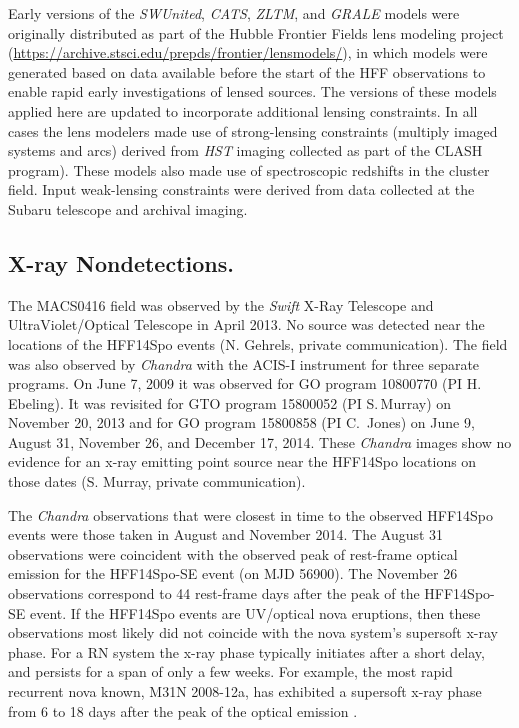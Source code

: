 \documentclass{article}
\providecommand\citep{\cite}
\def\HST{{\it HST}\xspace}
\def\Chandra{{\it Chandra}\xspace}
\def\Swift{{\it Swift}\xspace}
\def\spock{HFF14Spo\xspace}
\def\spocktwo{HFF14Spo-SE\xspace}
\def\MACS0416{MACS0416\xspace}
\begin{document}
Early versions of the {\it SWUnited}, {\it CATS}, {\it ZLTM}, and {\it
  GRALE} models were originally distributed as part of the Hubble
Frontier Fields lens modeling project
(\url{https://archive.stsci.edu/prepds/frontier/lensmodels/}), in
which models were generated based on data available before the start
of the HFF observations to enable rapid early investigations of lensed
sources. The versions of these models applied here are updated to
incorporate additional lensing constraints.  In all cases the lens
modelers made use of strong-lensing constraints (multiply imaged
systems and arcs) derived from \HST imaging collected as part of the
CLASH program\cite{Postman:2012}). These
models also made use of spectroscopic redshifts in the cluster
field\cite{Mann:2012, Christensen:2012, Grillo:2015, Caminha:2017}.
Input weak-lensing constraints were derived from data collected at the
Subaru telescope\cite{Umetsu:2014, Umetsu:2016} and archival imaging.

\subsection{X-ray Nondetections.}\label{sec:Xray}

The \MACS0416 field was observed by the \Swift X-Ray Telescope
and UltraViolet/Optical Telescope in April 2013.  No source was
detected near the locations of the \spock events (N. Gehrels, private
communication).  The field was also observed by \Chandra with the
ACIS-I instrument for three separate programs.  On June 7, 2009 it was
observed for GO program 10800770 (PI H.\,Ebeling).  It was revisited
for GTO program 15800052 (PI S.\,Murray) on November 20, 2013 and for
GO program 15800858 (PI C.\, Jones) on June 9, August 31, November
26, and December 17, 2014. These \Chandra images show no evidence for
an x-ray emitting point source near the \spock locations on those
dates (S. Murray, private communication).

The \Chandra observations that were closest in time to the observed
\spock events were those taken in August and November 2014.  The
August 31 observations were coincident with the observed peak of
rest-frame optical emission for the \spocktwo event (on MJD
56900). The November 26 observations correspond to 44 rest-frame days
after the peak of the \spocktwo event. If the \spock events are
UV/optical nova eruptions, then these observations most likely did not
coincide with the nova system's supersoft x-ray phase. For a RN system
the x-ray phase typically initiates after a short delay, and persists
for a span of only a few weeks. For example, the most rapid recurrent
nova known, M31N 2008-12a, has exhibited a supersoft x-ray phase from
6 to 18 days after the peak of the optical emission
\citep{Henze:2015a}.
\end{document}
